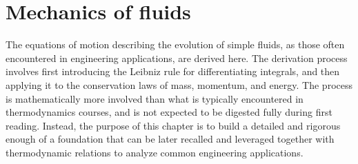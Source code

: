 \chapter{Mechanics of fluids}
The equations of motion describing the evolution of simple fluids, as those often encountered in engineering applications, are derived here. The derivation process involves first introducing the Leibniz rule for differentiating integrals, and then applying it to the conservation laws of mass, momentum, and energy. The process is mathematically more involved than what is typically encountered in thermodynamics courses, and is not expected to be digested fully during first reading. Instead, the purpose of this chapter is to build a detailed and rigorous enough of a foundation that can be later recalled and leveraged together with thermodynamic relations to analyze common engineering applications. 

